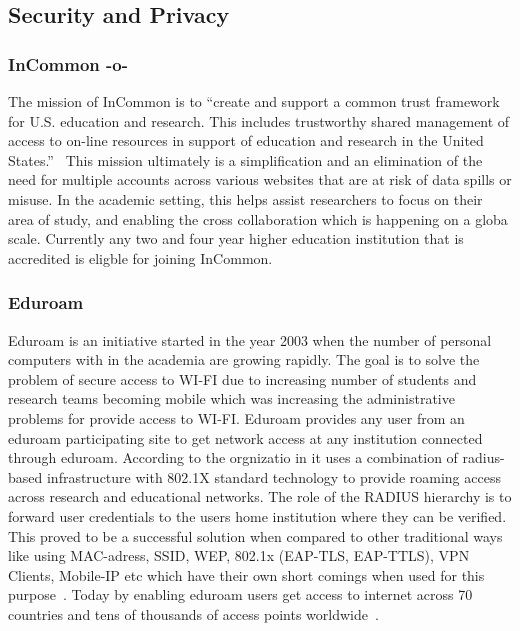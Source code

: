 \subsection{Security and Privacy}

\subsubsection{InCommon -o-}

The mission of InCommon is to ``create and support a common trust
framework for U.S. education and research.  This includes trustworthy
shared management of access to on-line resources in support of
education and research in the United States.''~\cite{www-incommon}
This mission ultimately is a simplification and an elimination of the
need for multiple accounts across various websites that are at risk of
data spills or misuse.  In the academic setting, this helps assist
researchers to focus on their area of study, and enabling the cross
collaboration which is happening on a globa scale.  Currently any two
and four year higher education institution that is accredited is
eligble for joining InCommon.

\subsubsection{Eduroam}

Eduroam is an initiative started in the year 2003 when the number of
personal computers with in the academia are growing rapidly. The goal
is to solve the problem of secure access to WI-FI due to increasing
number of students and research teams becoming mobile which was
increasing the administrative problems for provide access to
WI-FI. Eduroam provides any user from an eduroam participating site to
get network access at any institution connected through
eduroam. According to the orgnizatio in it uses a combination of
radius-based infrastructure with 802.1X standard technology to provide
roaming access across research and educational networks. The role of
the RADIUS hierarchy is to forward user credentials to the users home
institution where they can be verified. This proved to be a successful
solution when compared to other traditional ways like using
MAC-adress, SSID, WEP, 802.1x (EAP-TLS, EAP-TTLS), VPN Clients,
Mobile-IP etc which have their own short comings when used for this
purpose~\cite{eduroam-paper-2005}. Today by enabling eduroam users get
access to internet across 70 countries and tens of thousands of access
points worldwide~\cite{www-eduroam}.


